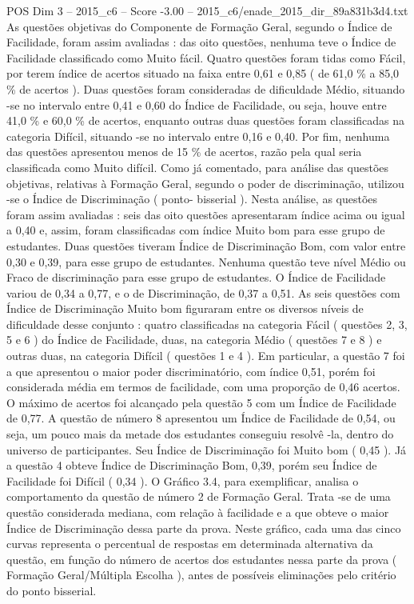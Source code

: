 \begin{textsample}{POS Dim 3 – 2015\_c6 – Score -3.00 – 2015\_c6/enade\_2015\_dir\_89a831b3d4.txt}
As questões objetivas do Componente de Formação Geral, segundo o Índice de Facilidade, foram assim avaliadas : das oito questões, nenhuma teve o Índice de Facilidade classificado como Muito fácil.
Quatro questões foram tidas como Fácil, por terem índice de acertos situado na faixa entre 0,61 e 0,85 ( de 61,0 \% a 85,0 \% de acertos ).
Duas questões foram consideradas de dificuldade Médio, situando -se no intervalo entre 0,41 e 0,60 do Índice de Facilidade, ou seja, houve entre 41,0 \% e 60,0 \% de acertos, enquanto outras duas questões foram classificadas na categoria Difícil, situando -se no intervalo entre 0,16 e 0,40.
Por fim, nenhuma das questões apresentou menos de 15 \% de acertos, razão pela qual seria classificada como Muito difícil.
Como já comentado, para análise das questões objetivas, relativas à Formação Geral, segundo o poder de discriminação, utilizou -se o Índice de Discriminação ( ponto- bisserial ).
Nesta análise, as questões foram assim avaliadas : seis das oito questões apresentaram índice acima ou igual a 0,40 e, assim, foram classificadas com índice Muito bom para esse grupo de estudantes.
Duas questões tiveram Índice de Discriminação Bom, com valor entre 0,30 e 0,39, para esse grupo de estudantes.
Nenhuma questão teve nível Médio ou Fraco de discriminação para esse grupo de estudantes.
O Índice de Facilidade variou de 0,34 a 0,77, e o de Discriminação, de 0,37 a 0,51.
As seis questões com Índice de Discriminação Muito bom figuraram entre os diversos níveis de dificuldade desse conjunto : quatro classificadas na categoria Fácil ( questões 2, 3, 5 e 6 ) do Índice de Facilidade, duas, na categoria Médio ( questões 7 e 8 ) e outras duas, na categoria Difícil ( questões 1 e 4 ).
Em particular, a questão 7 foi a que apresentou o maior poder discriminatório, com índice 0,51, porém foi considerada média em termos de facilidade, com uma proporção de 0,46 acertos.
O máximo de acertos foi alcançado pela questão 5 com um Índice de Facilidade de 0,77.
A questão de número 8 apresentou um Índice de Facilidade de 0,54, ou seja, um pouco mais da metade dos estudantes conseguiu resolvê -la, dentro do universo de participantes.
Seu Índice de Discriminação foi Muito bom ( 0,45 ).
Já a questão 4 obteve Índice de Discriminação Bom, 0,39, porém seu Índice de Facilidade foi Difícil ( 0,34 ).
O Gráfico 3.4, para exemplificar, analisa o comportamento da questão de número 2 de Formação Geral.
Trata -se de uma questão considerada mediana, com relação à facilidade e a que obteve o maior Índice de Discriminação dessa parte da prova.
Neste gráfico, cada uma das cinco curvas representa o percentual de respostas em determinada alternativa da questão, em função do número de acertos dos estudantes nessa parte da prova ( Formação Geral/Múltipla Escolha ), antes de possíveis eliminações pelo critério do ponto bisserial.

\end{textsample}
